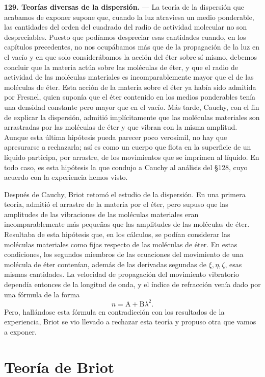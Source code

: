 \noindent\textbf{129. Teorías diversas de la dispersión.} — La teoría de la dispersión que acabamos de exponer
supone que, cuando la luz atraviesa un medio ponderable, las cantidades del
orden del cuadrado del radio de actividad molecular no son despreciables.
Puesto que podíamos despreciar esas cantidades cuando, en los capítulos
precedentes, no nos ocupábamos más que de la propagación de la luz en el
vacío y en que solo considerábamos la acción del éter sobre sí mismo,
debemos concluir que la materia actúa sobre las moléculas de éter, y que el
radio de actividad de las moléculas materiales es incomparablemente mayor
que el de las moléculas de éter. Esta acción de la materia sobre el éter
ya había sido admitida por Fresnel, quien suponía que el éter contenido en
los medios ponderables tenía una densidad constante pero mayor que en el
vacío. Más tarde, Cauchy, con el fin de explicar la dispersión, admitió
implícitamente que las moléculas materiales son arrastradas por las
moléculas de éter y que vibran con la misma amplitud. Aunque esta última
hipótesis pueda parecer poco verosímil, no hay que apresurarse a
rechazarla; así es como un cuerpo que flota en la superficie de un líquido
participa, por arrastre, de los movimientos que se imprimen al líquido. En
todo caso, es esta hipótesis la que condujo a Cauchy al análisis del
§128, cuyo acuerdo con la experiencia hemos visto.

Después de Cauchy, Briot retomó el estudio de la dispersión. En una
primera teoría, admitió el arrastre de la materia por el éter, pero supuso
que las amplitudes de las vibraciones de las moléculas materiales eran
incomparablemente más pequeñas que las amplitudes de las moléculas de
éter. Resultaba de esta hipótesis que, en los cálculos, se podían
considerar las moléculas materiales como fijas respecto de las moléculas
de éter. En estas condiciones, los segundos miembros de las ecuaciones del
movimiento de una molécula de éter contenían, además de las derivadas
segundas de $\xi,\eta,\zeta$, esas mismas cantidades. La velocidad de
propagación del movimiento vibratorio dependía entonces de la longitud de
onda, y el índice de refracción venía dado por una fórmula de la forma
\[
n=\mathrm A+\mathrm B\lambda^2.
\]
Pero, hallándose esta fórmula en contradicción con los resultados de la
experiencia, Briot se vio llevado a rechazar esta teoría y propuso otra
que vamos a exponer.

\section{Teoría de Briot}

